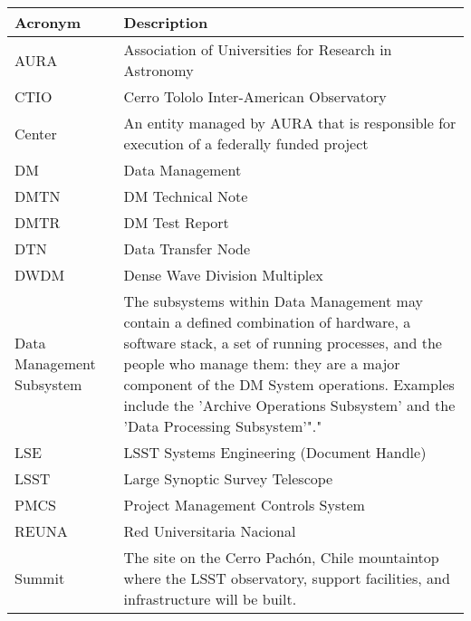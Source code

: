 \addtocounter{table}{-1}
\begin{longtable}{|p{}|p{}|}\hline
\textbf{Acronym} & \textbf{Description}  \\\hline

AURA & Association of Universities for Research in Astronomy \\\hline
CTIO & Cerro Tololo Inter-American Observatory \\\hline
Center & An entity managed by AURA that is responsible for execution of a federally funded project \\\hline
DM & Data Management \\\hline
DMTN & DM Technical Note \\\hline
DMTR & DM Test Report \\\hline
DTN & Data Transfer Node \\\hline
DWDM & Dense Wave Division Multiplex \\\hline
Data Management Subsystem & The subsystems within Data Management may contain a defined combination of hardware, a software stack, a set of running processes, and the people who manage them: they are a major component of the DM System operations. Examples include the 'Archive Operations Subsystem' and the 'Data Processing Subsystem'"." \\\hline
LSE & LSST Systems Engineering (Document Handle) \\\hline
LSST & Large Synoptic Survey Telescope \\\hline
PMCS & Project Management Controls System \\\hline
REUNA & Red Universitaria Nacional \\\hline
Summit & The site on the Cerro Pachón, Chile mountaintop where the LSST observatory, support facilities, and infrastructure will be built. \\\hline
\end{longtable}
